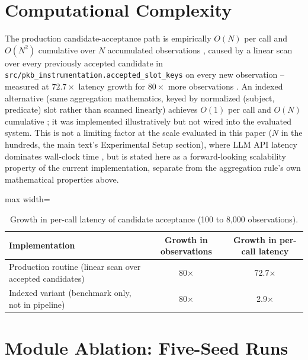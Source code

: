 \documentclass[11pt]{article}
\begin{document}
\section{Computational Complexity}
\label{sec:formal-analysis-complexity}

The production candidate-acceptance path is empirically $O(N)$ per call
and $O(N^2)$ cumulative over $N$ accumulated observations
, caused by a linear scan over every previously accepted candidate in
\texttt{src/pkb\_instrumentation.accepted\_slot\_keys} on every new
observation -- measured at $72.7\times$ latency growth for $80\times$
more observations
. An indexed alternative (same aggregation mathematics, keyed by
normalized (subject, predicate) slot rather than scanned linearly)
achieves $O(1)$ per call and $O(N)$ cumulative
; it was implemented illustratively but not wired into the evaluated
system. This is not a limiting factor at the scale evaluated in this
paper ($N$ in the hundreds, the main text's Experimental Setup section), where
LLM API latency dominates wall-clock time
, but is stated here as a forward-looking scalability property of the
current implementation, separate from the aggregation rule's own
mathematical properties above.


\begin{table}[htbp]
\centering
\caption{Growth in per-call latency of candidate acceptance (100 to
8,000 observations).}
\label{tab:s8-complexity}
\begin{adjustbox}{max width=\textwidth}
\begin{tabular}{@{}lcc@{}}
\toprule
Implementation & Growth in observations & Growth in per-call latency \\
\midrule
Production routine (linear scan over accepted candidates) & 80$\times$ & 72.7$\times$ \\
Indexed variant (benchmark only, not in pipeline) & 80$\times$ & 2.9$\times$ \\
\bottomrule
\end{tabular}
\end{adjustbox}
\end{table}

\section{Module Ablation: Five-Seed Runs}
\label{sec:s4}
\end{document}
